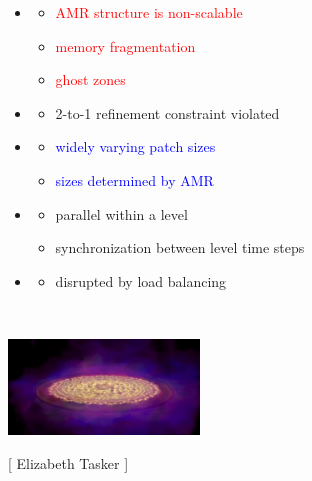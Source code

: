 \begin{frame}[fragile,label=ss-approach]
\begin{minipage}{3.0in}
\begin{itemize}
\item {}
\begin{itemize}
  \item<2-> \textcolor{red}{AMR structure is non-scalable}
  \item<2-> \textcolor{red}{memory fragmentation}
  \item<2-> \textcolor{red}{ghost zones}
\end{itemize}
\item {}
\begin{itemize}
   \item<3-> \textcolor{green!80!black}{2-to-1 refinement constraint violated}
\end{itemize}
\item {}
\begin{itemize}
   \item<4-> \textcolor{blue}{widely varying patch sizes}
   \item<4-> \textcolor{blue}{sizes determined by AMR}
\end{itemize}
\item {}
\begin{itemize}
   \item<5-> \textcolor{cyan!80!black}{parallel within a level}
   \item<5-> \textcolor{cyan!80!black}{synchronization between level time steps}
\end{itemize}
\item {}
\begin{itemize}
   \item<6-> \textcolor{orange!80!black}{disrupted by load balancing}
\end{itemize}
\end{itemize}
\end{minipage} \
\begin{minipage}{1.0in}
\centerline{\includegraphics[width=2.0in,angle=90]{iso_and_volume_02_sm.jpg}}
\centerline{\tiny{[ Elizabeth Tasker ]}}
\end{minipage}
\end{frame}
